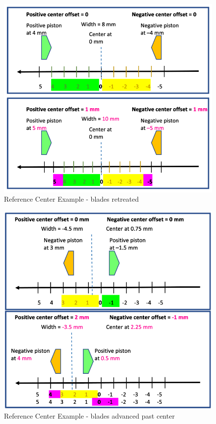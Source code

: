 \documentclass[openany]{article}
\begin{document}
    \begin{figure}[!h]
        \caption{Reference Center Example - blades retreated}
        \label{fig:reference-center-1}
        \centering
        \includegraphics[width=1.0\textwidth]{diff_ctrl_reference_center_1}
    \end{figure}
    \FloatBarrier

    \begin{figure}[!h]
        \caption{Reference Center Example - blades advanced past center}
        \label{fig:reference-center-2}
        \centering
        \includegraphics[width=1.0\textwidth]{diff_ctrl_reference_center_2}
    \end{figure}
    \FloatBarrier
\end{document}
